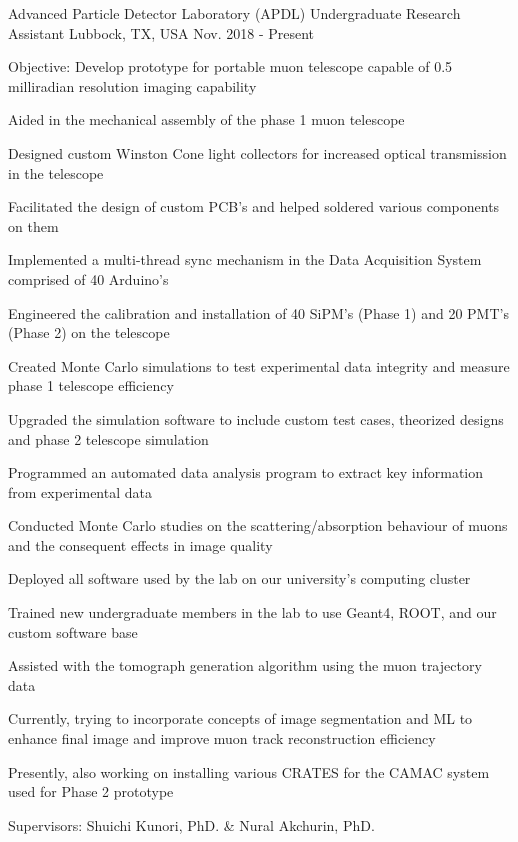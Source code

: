 \begin{cventries}
    \cventry
    {Advanced Particle Detector Laboratory (APDL)}
    {Undergraduate Research Assistant}
    {Lubbock, TX, USA}
    {Nov. 2018 - Present}
    {
        \begin{cvitems}
        \item{Objective: Develop prototype for portable muon telescope capable of 0.5 milliradian resolution imaging capability} 
        \item{Aided in the mechanical assembly of the phase 1 muon telescope}
        \item{Designed custom Winston Cone light collectors for increased optical transmission in the telescope}
        \item{Facilitated the design of custom PCB's and helped soldered various components on them}
        \item{Implemented a multi-thread sync mechanism in the Data Acquisition System comprised of 40 Arduino's}
        \item{Engineered the calibration and installation of 40 SiPM's (Phase 1) and 20 PMT's (Phase 2) on the telescope}
        \item{Created Monte Carlo simulations to test experimental data integrity and measure phase 1 telescope efficiency}
        \item{Upgraded the simulation software to include custom test cases, theorized designs and phase 2 telescope simulation}
        \item{Programmed an automated data analysis program to extract key information from experimental data}    
        \item{Conducted Monte Carlo studies on the scattering/absorption behaviour of muons and the consequent effects in image quality}
        \item{Deployed all software used by the lab on our university's computing cluster}
        \item{Trained new undergraduate members in the lab to use Geant4, ROOT, and our custom software base}
        \item{Assisted with the tomograph generation algorithm using the muon trajectory data}
        \item{Currently, trying to incorporate concepts of image segmentation and ML to enhance final image and improve muon track reconstruction efficiency}
        \item{Presently, also working on installing various CRATES for the CAMAC system used for Phase 2 prototype}
        \item{Supervisors: Shuichi Kunori, PhD. \& Nural Akchurin, PhD.}
        \end{cvitems}
        \vspace{1em}
    }


\end{cventries}
